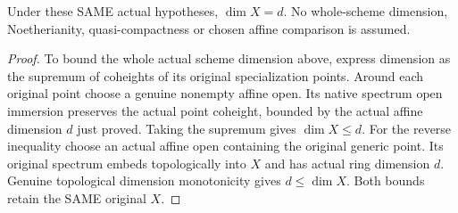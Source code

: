 \begin{theorem}
\label{scheme:actual-global-function-field-dimension}
\leanok
{}
Under these SAME actual hypotheses, $\dim X=d$. No whole-scheme dimension,
Noetherianity, quasi-compactness or chosen affine comparison is assumed.
\end{theorem}
\begin{proof}
To bound the whole actual scheme dimension above, express dimension as the
supremum of coheights of its original specialization points. Around each
original point choose a genuine nonempty affine open. Its native spectrum
open immersion preserves the actual point coheight, bounded by the actual
affine dimension $d$ just proved. Taking the supremum gives $\dim X\le d$.
For the reverse inequality choose an actual affine open containing the
original generic point. Its original spectrum embeds topologically into
$X$ and has actual ring dimension $d$. Genuine topological dimension
monotonicity gives $d\le\dim X$. Both bounds retain the SAME original $X$.
\end{proof}
